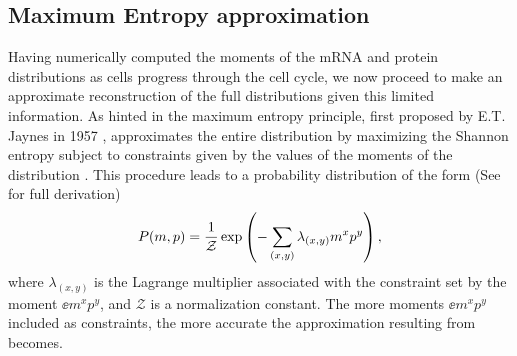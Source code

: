 \subsection{Maximum Entropy approximation}\label{sec_maxent}

Having numerically computed the moments of the mRNA and protein distributions
as cells progress through the cell cycle, we now proceed to make an
approximate reconstruction of the full distributions given this limited
information. As hinted in  the maximum entropy principle,
first proposed by E.T. Jaynes in 1957 \cite{Jaynes1957}, approximates the
entire distribution by maximizing the Shannon entropy subject to constraints
given by the values of the moments of the distribution \cite{Jaynes1957}. This
procedure leads to a probability distribution of the form (See
 for full derivation)
\begin{equation}
  P(m, p) = {1 \over \mathcal{Z}}
              \exp \left( - \sum_{(x,y)} \lambda_{(x,y)} m^x p^y \right),
  \label{eq_maxEnt_joint}
\end{equation}
where $\lambda_{(x,y)}$ is the Lagrange multiplier associated with the
constraint set by the moment $\ee{m^x p^y}$, and $\mathcal{Z}$ is a
normalization constant. The more moments $\ee{m^x p^y}$ included as
constraints, the more accurate the approximation resulting from
 becomes.


